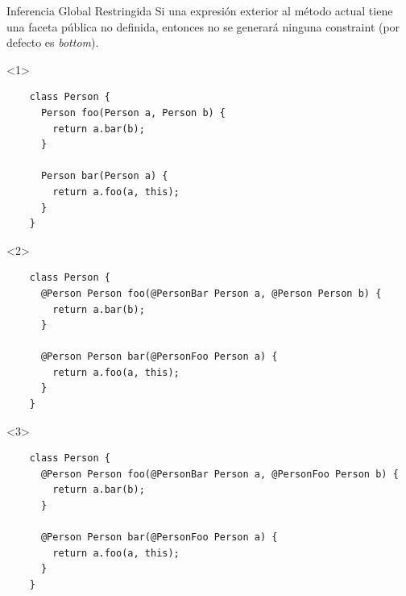 \documentclass[aspectratio=169,10pt]{beamer}
\begin{document}
\begin{frame}[fragile]{Inferencia Global Restringida}
  Si una expresión exterior al método actual tiene una faceta pública no definida, entonces no se generará ninguna constraint (por defecto es \textit{bottom}).
  \begin{onlyenv}<1>
		\only<2-|handout:0>{\stepcounter{framenumber}}
    \begin{lstlisting}
    class Person {
      Person foo(Person a, Person b) {
        return a.bar(b);
      }

      Person bar(Person a) {
        return a.foo(a, this);
      }
    }
    \end{lstlisting}
  \end{onlyenv}
  \begin{onlyenv}<2>
    \begin{lstlisting}
    class Person {
      @Person Person foo(@PersonBar Person a, @Person Person b) {
        return a.bar(b);
      }

      @Person Person bar(@PersonFoo Person a) {
        return a.foo(a, this);
      }
    }
    \end{lstlisting}
  \end{onlyenv}
    \begin{onlyenv}<3>
    \begin{lstlisting}
    class Person {
      @Person Person foo(@PersonBar Person a, @PersonFoo Person b) {
        return a.bar(b);
      }

      @Person Person bar(@PersonFoo Person a) {
        return a.foo(a, this);
      }
    }
    \end{lstlisting}
  \end{onlyenv}
\end{frame}
\end{document}
